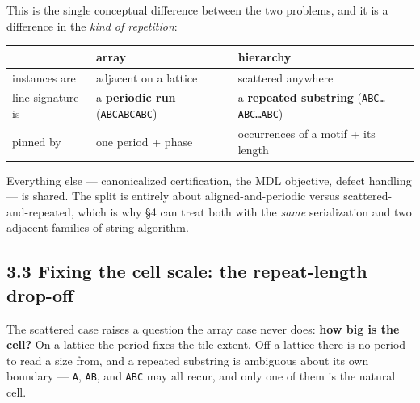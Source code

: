 \documentclass[
  11pt,
]{article}
\newcounter{none} %
\begin{document}
This is the single conceptual difference between the two problems, and
it is a difference in the \emph{kind of repetition}:

{\def\LTcaptype{none} %
\begin{longtable}[]{@{}
  >{\raggedright\arraybackslash}p{}
  >{\raggedright\arraybackslash}p{}
  >{\raggedright\arraybackslash}p{}@{}}
\toprule\noalign{}
\begin{minipage}[b]{\linewidth}\raggedright
\end{minipage} & \begin{minipage}[b]{\linewidth}\raggedright
array
\end{minipage} & \begin{minipage}[b]{\linewidth}\raggedright
hierarchy
\end{minipage} \\
\midrule\noalign{}
\endhead
\bottomrule\noalign{}
\endlastfoot
instances are & adjacent on a lattice & scattered anywhere \\
line signature is & a \textbf{periodic run} (\texttt{ABCABCABC}) & a
\textbf{repeated substring} (\texttt{ABC…ABC…ABC}) \\
pinned by & one period + phase & occurrences of a motif + its length \\
\end{longtable}
}

Everything else --- canonicalized certification, the MDL objective,
defect handling --- is shared. The split is entirely about
aligned-and-periodic versus scattered-and-repeated, which is why §4 can
treat both with the \emph{same} serialization and two adjacent families
of string algorithm.

\subsection{3.3 Fixing the cell scale: the repeat-length
drop-off}\label{fixing-the-cell-scale-the-repeat-length-drop-off}

The scattered case raises a question the array case never does:
\textbf{how big is the cell?} On a lattice the period fixes the tile
extent. Off a lattice there is no period to read a size from, and a
repeated substring is ambiguous about its own boundary --- \texttt{A},
\texttt{AB}, and \texttt{ABC} may all recur, and only one of them is the
natural cell.
\end{document}
